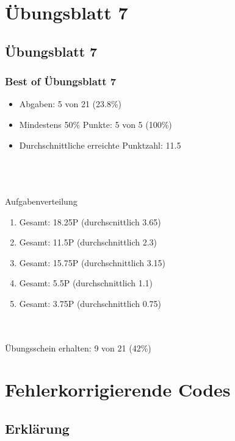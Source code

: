 




\section{Übungsblatt 7}
\subsection{Übungsblatt 7}

\begin{frame}
\frametitle{Best of Übungsblatt 7}
\begin{itemize}
	\item Abgaben: 5 von 21 (23.8\%)
	\item Mindestens 50\% Punkte: 5 von 5 (100\%)
	\item Durchschnittliche erreichte Punktzahl: 11.5
\end{itemize}~\\~\\~\\
Aufgabenverteilung
\begin{enumerate}[{A}ufg{a}be 1:]
	\item Gesamt: 18.25P (durchscnittlich 3.65)
	\item Gesamt: 11.5P (durchschnittlich 2.3)
	\item Gesamt: 15.75P (durchschnittlich 3.15)
	\item Gesamt: 5.5P (durchschnittlich 1.1)
	\item Gesamt: 3.75P (durchschnittlich 0.75)
\end{enumerate}~\\~\\
Übungsschein erhalten: 9 von 21 (42\%)
\end{frame}


\section{Fehlerkorrigierende Codes}
\subsection{Erklärung}


